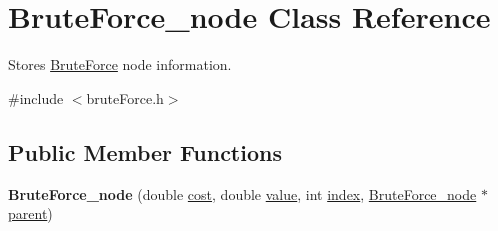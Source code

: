 \hypertarget{class_brute_force__node}{}\section{Brute\+Force\+\_\+node Class Reference}
\label{class_brute_force__node}


Stores \hyperlink{class_brute_force}{Brute\+Force} node information.  




{\ttfamily \#include $<$brute\+Force.\+h$>$}

\subsection*{Public Member Functions}
\begin{DoxyCompactItemize}
\item 
\hypertarget{class_brute_force__node_ab2a092a26530d99fe515a7266aa6baa8}{}{\bfseries Brute\+Force\+\_\+node} (double \hyperlink{class_brute_force__node_a0d93e3e7884d87d08ac9a082e581e76e}{cost}, double \hyperlink{class_brute_force__node_a372846f04cf2d57b6d08dd567edb5aa1}{value}, int \hyperlink{class_brute_force__node_a9b304b9a8fa18d5375d918724be1d609}{index}, \hyperlink{class_brute_force__node}{Brute\+Force\+\_\+node} $\ast$\hyperlink{class_brute_force__node_adb55f9527682707394b04e9474efc2cc}{parent})\label{class_brute_force__node_ab2a092a26530d99fe515a7266aa6baa8}

\end{DoxyCompactItemize}
